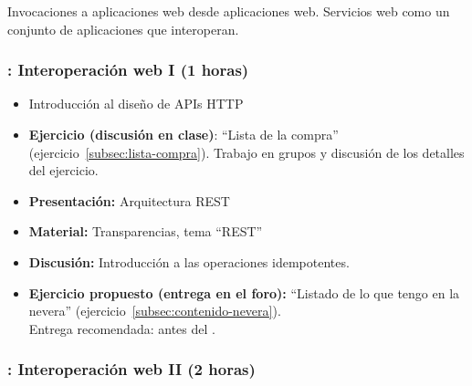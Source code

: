 \documentclass[a4paper,12pt]{article}
\begin{document}
Invocaciones a aplicaciones web desde aplicaciones web. Servicios web como un conjunto de aplicaciones que interoperan.

\subsubsection{\martesE: Interoperación web I (1 horas)}
\label{cal:martesE}

\begin{itemize}
\item Introducción al diseño de APIs HTTP
\item \textbf{Ejercicio (discusión en clase)}: ``Lista de la compra'' (ejercicio~\ref{subsec:lista-compra}).
  Trabajo en grupos y discusión de los detalles del ejercicio.
\item \textbf{Presentación:} Arquitectura REST
\item \textbf{Material:} Transparencias, tema ``REST''
\item \textbf{Discusión:} Introducción a las operaciones idempotentes.
\item \textbf{Ejercicio propuesto (entrega en el foro):} ``Listado de lo que tengo en la nevera'' (ejercicio~\ref{subsec:contenido-nevera}). \\
  Entrega recomendada: antes del \martesF.
\end{itemize}

\subsubsection{\martesF: Interoperación web II (2 horas)}
\label{cal:martesF}
\end{document}
